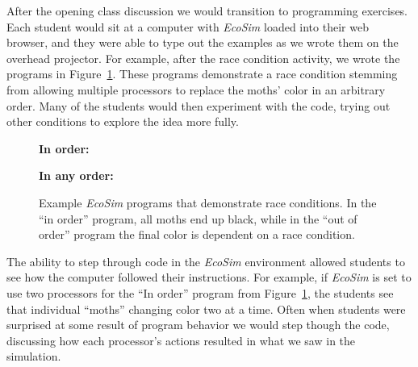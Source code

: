 \documentclass{sig-alternate}
\newcommand{\INDSTATE}[1][1]{\STATE\hspace{#1\algorithmicindent}}
\newcommand{\EcoSim}{\emph{EcoSim}}
\begin{document}
After the opening class discussion we would transition to programming exercises.
Each student would sit at a computer with \emph{EcoSim} loaded into their
web browser, and they were able to type out the examples as we wrote them on the overhead projector.
For example, after the race condition activity, we wrote the programs in Figure~\ref{fig:race-conditions}. 
These programs demonstrate a race condition stemming from allowing multiple
processors to replace the moths' color in an arbitrary order.
Many of the students would then experiment with the code, 
trying out other conditions to explore the idea more fully.
     
\begin{figure}
\begin{algorithmic}[1]\sf
\item[{\bf In order:}]
  \INDSTATE{a position}
  \INDSTATE{a color}
\STATE{}
  \INDSTATE{do in order}
  \INDSTATE[2]{replace the moth's color with gray}
  \INDSTATE[2]{replace the moth's color with black}
\end{algorithmic}

\begin{algorithmic}[1]\sf
\item[{\bf In any order:}]
  \INDSTATE{a position}
  \INDSTATE{a color}
\STATE{}
  \INDSTATE{do in any order}
  \INDSTATE[2]{replace the moth's color with gray}
  \INDSTATE[2]{replace the moth's color with black}
\end{algorithmic} 
\caption{Example \emph{EcoSim} programs that demonstrate race conditions.  In the
``in order'' program, all moths end up black, while in the ``out of order'' program
the final color is dependent on a race condition.}
\label{fig:race-conditions} 
\end{figure}

The ability to step through code in the {\EcoSim} environment allowed students to see how the computer followed their instructions.
For example, if \emph{EcoSim} is set to use two processors for the ``In order'' program from Figure~\ref{fig:race-conditions}, 
the students see that individual ``moths'' changing color two at a time.
Often when students were surprised at some result of program behavior
we would step though the code, discussing how each processor's actions resulted in what we saw in the simulation.
\end{document}
